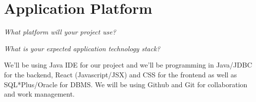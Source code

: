 \section{Application Platform}

\textit{What platform will your project use?}

\textit{What is your expected application technology stack?} 

We'll be using Java IDE for our project and we’ll be programming in Java/JDBC for the backend, React (Javascript/JSX) and CSS for the frontend as well as SQL*Plus/Oracle for DBMS. We will be using Github and Git for collaboration and work management. 

